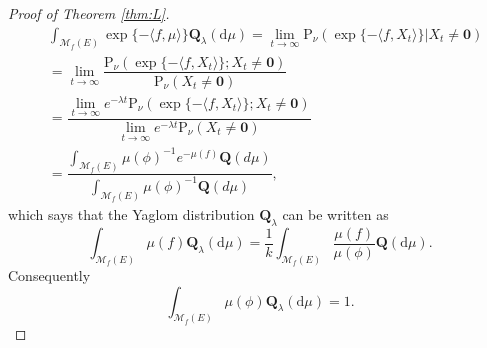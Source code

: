 \documentclass[12pt,a4paper]{amsart}
\numberwithin{equation}{section}
\theoremstyle{plain}
\theoremstyle{definition}
\theoremstyle{remark}
\begin{document}
\begin{proof}[Proof of Theorem \ref{thm:L}]
\begin{align*}
&\int_{\mathcal M_f(E)}\exp\{-\langle f, \mu\rangle \}\mathbf Q_\lambda(\mathrm d\mu)
=\lim_{t\rightarrow\infty}\mathrm P_\nu\left(\exp\{-\langle f, X_t\rangle \}\Big|X_t\neq \mathbf 0\right)\\
&=\lim_{t\rightarrow\infty}\dfrac{\mathrm P_\nu\left(\exp\{-\langle f, X_t\rangle \};X_t\neq \mathbf 0\right)}{\mathrm P_\nu(X_t\neq \mathbf 0)}\\
&=\dfrac{\lim_{t\rightarrow\infty}e^{-\lambda t}\mathrm P_\nu\left(\exp\{-\langle f, X_t\rangle \};X_t\neq \mathbf 0\right)}{\lim_{t\rightarrow\infty}e^{-\lambda t}\mathrm P_\nu(X_t\neq \mathbf 0)}\\
&=\dfrac{\int_{{\mathcal M}_f(E)}\mu(\phi)^{-1}e^{-\mu(f)}\mathbf Q(d\mu)}{\int_{{\mathcal M}_f(E)}\mu(\phi)^{-1}\mathbf Q(d\mu)},
\end{align*}
which says that the Yaglom distribution ${\mathbf Q}_\lambda$ can be written as
\begin{equation}\label{rep: yaglom}
\int_{\mathcal M_f(E)}\mu(f)\mathbf Q_\lambda(\mathrm d\mu)=\dfrac{1}{k}\int_{\mathcal M_f(E)}\frac{\mu(f)}{\mu(\phi)}\mathbf Q(\mathrm d\mu).
\end{equation}
Consequently
\begin{equation}\label{ident: k}
\int_{\mathcal M_f(E)}\mu(\phi)\mathbf Q_\lambda(\mathrm d\mu)=1.
\end{equation}



\end{proof}
\end{document}
